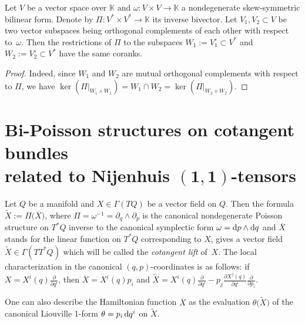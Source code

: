 \begin{Lemma}\label{lemM}Let $V$ be a vector space over $\mathbb{K}$ and $\omega\colon V\times V\to \mathbb{K}$ a nondegenerate skew-symmetric bilinear form. Denote by $\Pi\colon V^*\times V^*\to\mathbb{K}$ its inverse bivector. Let $V_1,V_2 \subset V$ be two vector subspaces being orthogonal complements of each other with respect to~$\omega$. Then the restrictions of $\Pi$ to the subspaces $W_1:=V_1^\circ \subset V^*$ and $W_2:=V_2^\circ \subset V^*$ have the same coranks.
\end{Lemma}

\begin{proof} Indeed, since $W_1$ and $W_2$ are mutual orthogonal complements with respect to $\Pi$, we have $\ker(\Pi|_{W_1\times W_1})=W_1\cap W_2=\ker(\Pi|_{W_2\times W_2})$.
\end{proof}

\section[Bi-Poisson structures on cotangent bundles related to Nijenhuis $(1,1)$-tensors]{Bi-Poisson structures on cotangent bundles\\ related to Nijenhuis $\boldsymbol{(1,1)}$-tensors}\label{sec:Bi-Poisson}

\begin{Definition}\label{defi2}Let $Q$ be a manifold and $X\in \Gamma(TQ)$ be a vector field on $Q$. Then the formula $\widetilde X:=\Pi\big(\overline X\big)$, where $\Pi=\omega^{-1}=\partial_q\wedge\partial_p$ is the canonical nondegenerate Poisson structure on $T^*Q$ inverse to the canonical symplectic form $\omega={\rm d}p\wedge {\rm d}q$ and $\overline X$ stands for the linear function on $T^*Q$ corresponding to $X$, gives a vector field $\widetilde X\in\Gamma(TT^*Q)$ which will be called the {\em cotangent lift} of~$X$. The local characterization in the canonical $(q,p)$-coordinates is as follows: if $X=X^i(q)\frac{\partial }{\partial q^i}$, then $\overline{X}=X^i(q)p_i$ and $\widetilde X=X^i(q)\frac{\partial }{\partial q^i}-p_j\frac{\partial X^j(q)}{\partial q^i}\frac{\partial }{\partial p_i}$.
\end{Definition}

\begin{Remark}\label{reem} One can also describe the Hamiltonian function $\overline{X}$ as the evaluation $\theta\big(\widetilde{X}\big)$ of the canonical Liouville 1-form $\theta=p_i\,{\rm d}q^i$ on $\widetilde{X}$.
\end{Remark}

